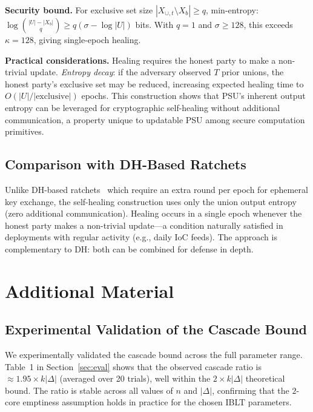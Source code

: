 \textbf{Security bound.}
For exclusive set size $|X_{\cup,t} \setminus X_b| \geq q$, min-entropy:
$\log\binom{|U|-|X_b|}{q} \geq q(\sigma - \log|U|)$ bits. With $q = 1$ and
$\sigma \geq 128$, this exceeds $\kappa = 128$, giving single-epoch healing.

\textbf{Practical considerations.}
Healing requires the honest party to make a non-trivial update. \emph{Entropy
decay}: if the adversary observed $T$ prior unions, the honest party's
exclusive set may be reduced, increasing expected healing time to
$O(|U|/|\text{exclusive}|)$ epochs. This construction shows that PSU's
inherent output entropy can be leveraged for cryptographic self-healing
without additional communication, a property unique to updatable PSU among
secure computation primitives.

\subsection{Comparison with DH-Based Ratchets}

Unlike DH-based ratchets~\cite{Signal} which require an extra round per
epoch for ephemeral key exchange, the self-healing construction uses only
the union output entropy (zero additional communication). Healing occurs
in a single epoch whenever the honest party makes a non-trivial
update---a condition naturally satisfied in deployments with regular
activity (e.g., daily IoC feeds). The approach is complementary to DH:
both can be combined for defense in depth.

\section{Additional Material}
\label{sec:additional}

\subsection{Experimental Validation of the Cascade Bound}

We experimentally validated the cascade bound across the full parameter
range. Table~1 in Section~\ref{sec:eval} shows that the
observed cascade ratio is $\approx 1.95 \times k|\Delta|$ (averaged over
20 trials), well within the $2 \times k|\Delta|$ theoretical bound. The
ratio is stable across all values of $n$ and $|\Delta|$, confirming that
the $2$-core emptiness assumption holds in practice for the chosen IBLT
parameters.

